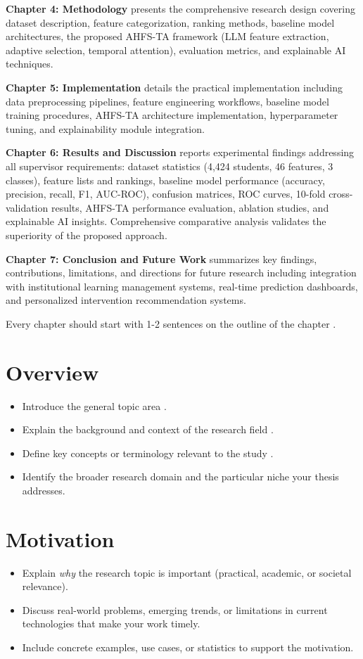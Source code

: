 \textbf{Chapter 4: Methodology} presents the comprehensive research design covering dataset description, feature categorization, ranking methods, baseline model architectures, the proposed AHFS-TA framework (LLM feature extraction, adaptive selection, temporal attention), evaluation metrics, and explainable AI techniques.

\textbf{Chapter 5: Implementation} details the practical implementation including data preprocessing pipelines, feature engineering workflows, baseline model training procedures, AHFS-TA architecture implementation, hyperparameter tuning, and explainability module integration.

\textbf{Chapter 6: Results and Discussion} reports experimental findings addressing all supervisor requirements: dataset statistics (4,424 students, 46 features, 3 classes), feature lists and rankings, baseline model performance (accuracy, precision, recall, F1, AUC-ROC), confusion matrices, ROC curves, 10-fold cross-validation results, AHFS-TA performance evaluation, ablation studies, and explainable AI insights. Comprehensive comparative analysis validates the superiority of the proposed approach.

\textbf{Chapter 7: Conclusion and Future Work} summarizes key findings, contributions, limitations, and directions for future research including integration with institutional learning management systems, real-time prediction dashboards, and personalized intervention recommendation systems.


Every chapter should start with 1-2 sentences on the outline of the chapter \cite{kleinberg2006algorithm}.

\section{Overview}
\begin{itemize}
    \item Introduce the general topic area \cite{paper2}.
    \item Explain the background and context of the research field \cite{bhuiyan2023empirical}.
    \item Define key concepts or terminology relevant to the study \cite{Zakon}.
    \item Identify the broader research domain and the particular niche your thesis addresses.
\end{itemize}

\section{Motivation}
\begin{itemize}
    \item Explain \textit{why} the research topic is important (practical, academic, or societal relevance).
    \item Discuss real-world problems, emerging trends, or limitations in current technologies that make your work timely.
    \item Include concrete examples, use cases, or statistics to support the motivation.
\end{itemize}

